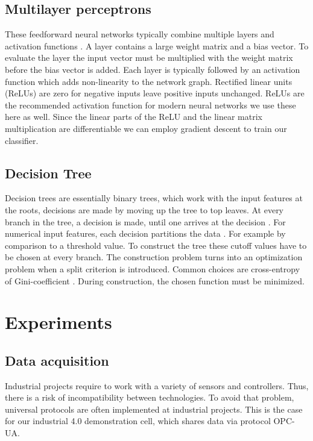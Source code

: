 \documentclass[5p,times,procedia]{elsarticle}
\begin{document}
\subsection{Multilayer perceptrons}
These feedforward neural networks typically combine multiple layers
and activation functions \cite{bishop2006pattern}.
A layer contains a large weight matrix and
a bias vector. To evaluate the layer the input vector must be
multiplied with the weight matrix before the bias vector is added.
Each layer is typically followed by an activation function 
which adds non-linearity to the network graph. Rectified linear units
(ReLUs) are zero for negative inputs leave positive inputs unchanged.
ReLUs are the recommended activation function for modern neural
networks \cite{goodfellow2016deep} we use these here as well.
Since the linear parts of the ReLU and the linear matrix multiplication
are differentiable we can employ gradient descent to train our 
classifier.

\subsection{Decision Tree}
Decision trees are essentially binary trees, which work with the input
features at the roots, decisions are made by moving
up the tree to top leaves. At every branch in the tree, a decision
is made, until one arrives at the decision \cite{Marsland2015Machine}.
For numerical input features, each decision partitions the data
\cite{aggarwal2015data}. For example by comparison to a threshold value.
To construct the tree these cutoff values have to be chosen
at every branch. The construction problem turns into an optimization 
problem when a split criterion is introduced. Common choices are 
cross-entropy of Gini-coefficient \cite{aggarwal2015data}.
During construction, the chosen function must be minimized. 


\section{Experiments}

\subsection{Data acquisition}

Industrial projects require to work with a variety of sensors and controllers. Thus, there is a risk of incompatibility between technologies. To avoid that problem, universal protocols are often implemented at industrial projects. This is the case for our industrial 4.0 demonstration cell, which shares data via protocol OPC-UA. 
\end{document}
